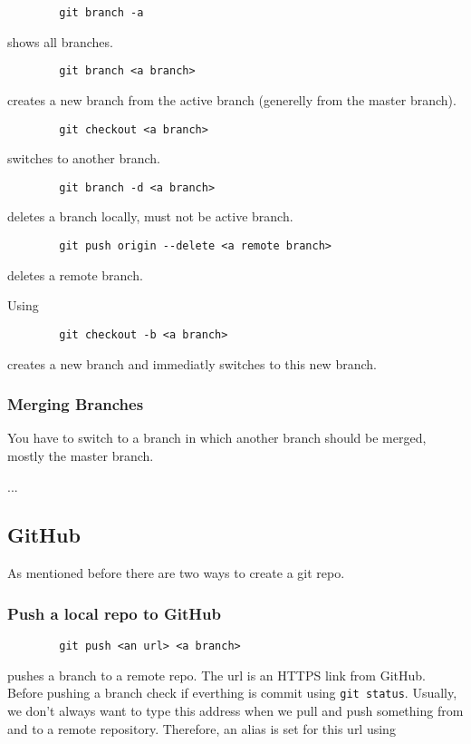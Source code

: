 \documentclass[12pt, twoside]{article}
\begin{document}
	\begin{verbatim}
		git branch -a
	\end{verbatim}
	shows all branches.
	
	\begin{verbatim}
		git branch <a branch>
	\end{verbatim}
	creates a new branch from the active branch (generelly from the master branch).
	
	\begin{verbatim}
		git checkout <a branch>
	\end{verbatim}
	switches to another branch.
	
	\begin{verbatim}
		git branch -d <a branch>
	\end{verbatim}
	deletes a branch locally, must not be active branch.
	
	\begin{verbatim}
		git push origin --delete <a remote branch>
	\end{verbatim}
	deletes a remote branch.
	
	Using
	\begin{verbatim}
		git checkout -b <a branch>
	\end{verbatim}
	creates a new branch and immediatly switches to this new branch.
	
	\subsubsection{Merging Branches}
	
	You have to switch to a branch in which another branch should be merged, mostly the master branch.
	
	...
	
	\subsection{GitHub}
	
	As mentioned before there are two ways to create a git repo.
	
	\subsubsection{Push a local repo to GitHub}
	
	\begin{verbatim}
		git push <an url> <a branch>
	\end{verbatim}
	pushes a branch to a remote repo. The url is an HTTPS link from GitHub. Before pushing a branch check if everthing is commit using \verb|git status|. Usually, we don't always want to type this address when we pull and push something from and to a remote repository. Therefore, an alias is set for this url using
	
\end{document}
